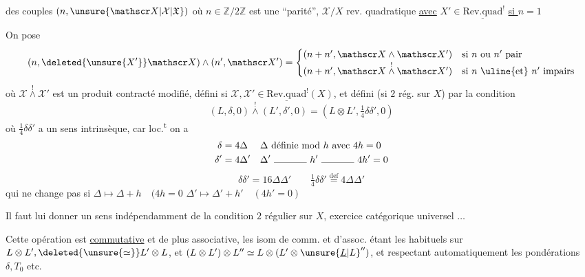 des couples $(n,\unsure{\mathscr X|\mathcal X|\mathfrak X})$ où $n\in\mathbb Z/2\mathbb Z$ est une ``parité'', $\mathscr X/X$ rev. quadratique \uline{avec} \quad $X'\in\underline{\mathrm{Rev.quad}}^{!}$ \uline{si $n=1$}

On pose
\[
(n,\deleted{\unsure{X'}}\mathscr X)\wedge(n',\mathscr X')=\begin{cases}(n+n',\mathscr X\wedge\mathscr X')&\text{si $n$ ou $n'$ pair}\\ (n+n',\mathscr X\overset{!}{\wedge}\mathscr X')&\text{si $n$ \uline{et} $n'$ impairs}\end{cases}
\]
où $\mathscr X\overset{!}{\wedge}\mathscr X'$ est un produit contracté modifié, défini si $\mathscr X,\mathscr X'\in\underline{\mathrm{Rev.quad}}^!(X)$, et défini (si $2$ rég. sur $X$) par la condition
\[
(L,\delta,0)\overset{!}{\wedge}(L',\delta',0)=(L\otimes L',\tfrac14\delta\delta',0)
\]
où $\tfrac14\delta\delta'$ a un sens intrinsèque, car loc.\textsuperscript{t} on a
\[
\begin{aligned}\delta&=4\Delta &&\Delta\ \text{définie mod }h\ \text{avec }4h=0\\ \delta'&=4\Delta' &&\Delta'\ \text{\rule{1.2cm}{.3pt} }h'\ \text{\rule{1.2cm}{.3pt} }4h'=0\end{aligned}
\]
\[
\delta\delta'=16\Delta\Delta'\qquad\tfrac14\delta\delta'\overset{\mathrm{def}}=4\Delta\Delta'
\]
qui ne change pas \unsure{--} si $\Delta\longmapsto\Delta+h\quad(4h=0$ \quad $\Delta'\longmapsto\Delta'+h'\quad(4h'=0)$

\leavevmode\llap{\rule[-2\baselineskip]{.3pt}{3\baselineskip}\hspace{2pt}\rule[-2\baselineskip]{.3pt}{3\baselineskip}\quad}Il faut lui donner un sens indépendamment de la condition $2$ régulier sur $X$, exercice catégorique universel $\ldots$

Cette opération est \uline{commutative}  et de plus associative, les isom de comm. et d'assoc. étant les habituels sur $L\otimes L',\deleted{\unsure{\simeq}}L'\otimes L$, et $(L\otimes L')\otimes L''\simeq L\otimes(L'\otimes{\unsure{\underline L|L}}'')$, et respectant automatiquement les pondérations $\delta,T_0$ etc.
